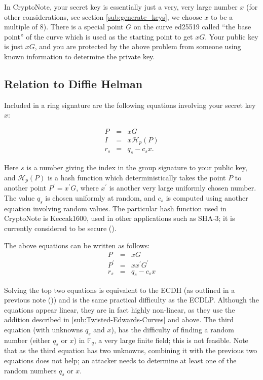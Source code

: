 \documentclass[12pt,english]{mrl}
\numberwithin{equation}{section}
\numberwithin{figure}{section}
\begin{document}
In CryptoNote, your secret key is essentially just a very, very large
number $x$ (for other considerations, see section \ref{sub:generate_keys},
we choose $x$ to be a multiple of $8$). There is a special point
$G$ on the curve ed25519 called ``the base point'' of the curve
which is used as the starting point to get $xG$. Your public key is just $xG$, and you are protected by the above problem from someone using known information to determine the private key.


\subsection{\label{sub:Relation-to-Diffie}Relation to Diffie Helman}

Included in a ring signature are the following equations
involving your secret key $x$:

\begin{eqnarray*}
P&=&xG \\
I&=&x\mathcal{H}_{p}\left(P\right) \\
r_{s}&=&q_{s}-c_{s}x.
\end{eqnarray*}

Here $s$ is a number giving the index in the group signature to
your public key, and $\mathcal{H}_{p}\left(P\right)$ is a hash function which
deterministically takes the point $P$ to another point $P^{\prime}=x^{\prime}G$,
where $x^{\prime}$ is another very large uniformly chosen number.
The value $q_s$ is chosen uniformly at random, and $c_s$ is computed using
another equation involving random values.
The particular hash function used in CryptoNote is Keccak1600,
used in other applications such as SHA-3; it is currently considered
to be secure (\cite{FIPS}). 

The above equations can be written as follows:
\begin{eqnarray*}
P&=&xG \\
P^{\prime}&=&xx^{\prime}G^{\prime} \\
r_{s}&=&q_{s}-c_{s}x
\end{eqnarray*}

Solving the top two equations
is equivalent to the ECDH (as outlined in a previous note (\cite{SN}))
and is the same practical difficulty as the ECDLP.
Although the equations appear linear, they are in fact highly non-linear,
as they use the addition described in \ref{sub:Twisted-Edwards-Curves} and above.
The third equation (with unknowns $q_{s}$ and $x$), has the difficulty
of finding a random number (either $q_{s}$ or $x$) in $\mathbb{F}_{q}$,
a very large finite field; this is not feasible.
Note that as the third equation has two unknowns, combining
it with the previous two equations does not help; an attacker needs to
determine at least one of the random numbers $q_{s}$ or $x$. 
\end{document}
